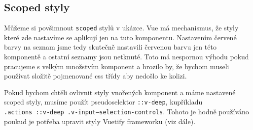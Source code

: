 \subsection*{Scoped styly}

Můžeme si povšimnout \texttt{scoped} stylů v ukázce. Vue má mechanismus, že styly které zde nastavíme se aplikují jen na tuto komponentu. Nastavením červené barvy na seznam jsme tedy skutečně nastavili červenou barvu jen této komponentě a ostatní seznamy jsou netknuté. Toto má nespornou výhodu pokud pracujeme s velkým množstvím komponent a hrozilo by, že bychom museli používat složitě pojmenované css třídy aby nedošlo ke kolizi.

Pokud bychom chtěli ovlivnit styly vnořených komponent a máme nastavené scoped styly, musíme použít pseudoselektor \texttt{::v-deep}, kupříkladu \\ \texttt{.actions ::v-deep .v-input--selection-controls}. Tohoto je hodně používáno poukud je potřeba upravit styly Vuetify frameworku (viz dále).